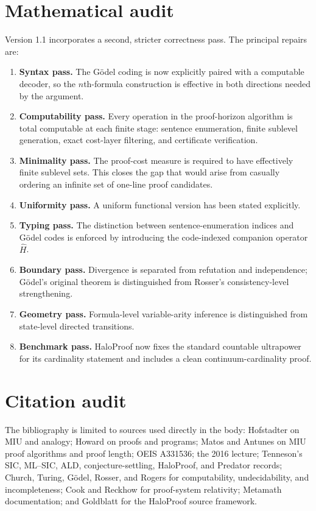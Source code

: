 \documentclass[11pt,oneside]{book}
\theoremstyle{definition}
\theoremstyle{remark}
\begin{document}
\section{Mathematical audit}
Version 1.1 incorporates a second, stricter correctness pass. The principal repairs are:
\begin{enumerate}
\item \textbf{Syntax pass.} The G\"odel coding is now explicitly paired with a computable decoder, so the $n$th-formula construction is effective in both directions needed by the argument.
\item \textbf{Computability pass.} Every operation in the proof-horizon algorithm is total computable at each finite stage: sentence enumeration, finite sublevel generation, exact cost-layer filtering, and certificate verification.
\item \textbf{Minimality pass.} The proof-cost measure is required to have effectively finite sublevel sets. This closes the gap that would arise from casually ordering an infinite set of one-line proof candidates.
\item \textbf{Uniformity pass.} A uniform functional version has been stated explicitly.
\item \textbf{Typing pass.} The distinction between sentence-enumeration indices and G\"odel codes is enforced by introducing the code-indexed companion operator $\widehat H$.
\item \textbf{Boundary pass.} Divergence is separated from refutation and independence; G\"odel's original theorem is distinguished from Rosser's consistency-level strengthening.
\item \textbf{Geometry pass.} Formula-level variable-arity inference is distinguished from state-level directed transitions.
\item \textbf{Benchmark pass.} HaloProof now fixes the standard countable ultrapower for its cardinality statement and includes a clean continuum-cardinality proof.
\end{enumerate}

\section{Citation audit}
The bibliography is limited to sources used directly in the body: Hofstadter on MIU and analogy; Howard on proofs and programs; Matos and Antunes on MIU proof algorithms and proof length; OEIS A331536; the 2016 lecture; Tenneson's SIC, ML--SIC, ALD, conjecture-settling, HaloProof, and Predator records; Church, Turing, G\"odel, Rosser, and Rogers for computability, undecidability, and incompleteness; Cook and Reckhow for proof-system relativity; Metamath documentation; and Goldblatt for the HaloProof source framework.
\end{document}
